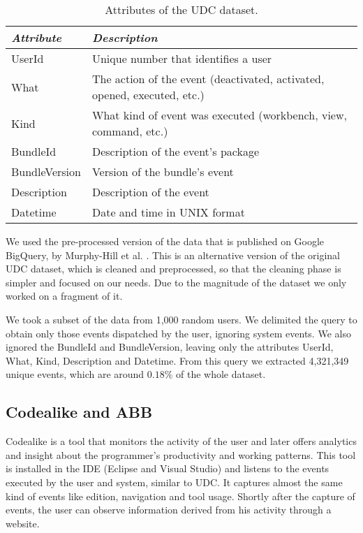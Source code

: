 \begin{table}[ht!]
	\small
	\caption{Attributes of the UDC dataset. }
	\label{tbl:att_udc}
	\centering
	\begin{tabular}{p{2.5cm}|p{7cm}} 
		\hline 
		\emph{Attribute} & \emph{Description} \\  
		\hline 
		\hline 
		UserId &  Unique number that identifies a user \\
		\hline
		What & The action of the event (deactivated, activated, opened, executed, etc.)  \\
		\hline
		Kind & What kind of event was executed (workbench, view, command, etc.)  \\
		\hline
		BundleId & Description of the event's package  \\
		\hline
		BundleVersion & Version of the bundle's event  \\
		\hline
		Description & Description of the event\\
		\hline
		Datetime & Date and time in UNIX format\\
		\hline
	\end{tabular}
	
\end{table}

We used the pre-processed version of the data that is published on Google BigQuery, by Murphy-Hill et al. \cite{SnipesETALASD}. This is an alternative version of the original UDC dataset, which is cleaned and preprocessed, so that the cleaning phase is simpler and focused on our needs. Due to the magnitude of the dataset we only worked on a fragment of it. 

We took a subset of the data from 1,000 random users. We delimited the query to obtain only those events dispatched by the user, ignoring system events. We also ignored the BundleId and BundleVersion, leaving only the attributes UserId, What, Kind, Description and Datetime. From this query we extracted 4,321,349 unique events, which are around $0.18\%$ of the whole dataset.

\subsection{Codealike and ABB}
Codealike \cite{CLQ15} is a tool that monitors the activity of the user and later offers analytics and insight about the programmer's productivity and working patterns. This tool is installed in the IDE (Eclipse and Visual Studio) and listens to the events executed by the user and system, similar to UDC. It captures almost the same kind of events like edition, navigation and tool usage. Shortly after the capture of events, the user can observe information derived from his activity through a website.

